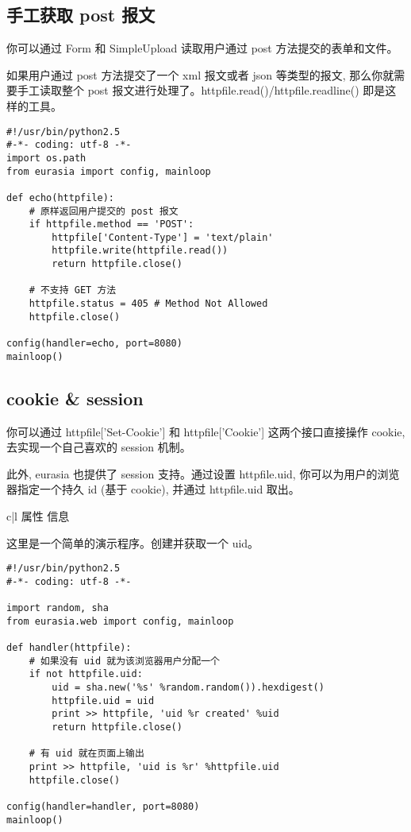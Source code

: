 \documentclass{manual}
\begin{document}

\subsection{手工获取 post 报文}

你可以通过 Form 和 SimpleUpload 读取用户通过 post 方法提交的表单和文件。

如果用户通过 post 方法提交了一个 xml 报文或者 json 等类型的报文,
那么你就需要手工读取整个 post 报文进行处理了。httpfile.read()/httpfile.readline() 即是这样的工具。

\begin{verbatim}
#!/usr/bin/python2.5
#-*- coding: utf-8 -*-
import os.path
from eurasia import config, mainloop

def echo(httpfile):
	# 原样返回用户提交的 post 报文
	if httpfile.method == 'POST':
		httpfile['Content-Type'] = 'text/plain'
		httpfile.write(httpfile.read())
		return httpfile.close()

	# 不支持 GET 方法
	httpfile.status = 405 # Method Not Allowed
	httpfile.close()

config(handler=echo, port=8080)
mainloop()
\end{verbatim}



\subsection{cookie \& session}

你可以通过 httpfile['Set-Cookie'] 和 httpfile['Cookie'] 这两个接口直接操作 cookie, 去实现一个自己喜欢的 session 机制。

此外, eurasia 也提供了 session 支持。通过设置 httpfile.uid, 你可以为用户的浏览器指定一个持久 id (基于 cookie), 并通过 httpfile.uid 取出。

\begin{tableii}{c|l}{}{ 属性 }{ 信息 }
\end{tableii}

这里是一个简单的演示程序。创建并获取一个 uid。

\begin{verbatim}
#!/usr/bin/python2.5
#-*- coding: utf-8 -*-

import random, sha
from eurasia.web import config, mainloop

def handler(httpfile):
	# 如果没有 uid 就为该浏览器用户分配一个
	if not httpfile.uid:
		uid = sha.new('%s' %random.random()).hexdigest()
		httpfile.uid = uid
		print >> httpfile, 'uid %r created' %uid
		return httpfile.close()

	# 有 uid 就在页面上输出
	print >> httpfile, 'uid is %r' %httpfile.uid
	httpfile.close()

config(handler=handler, port=8080)
mainloop()
\end{verbatim}
\end{document}
